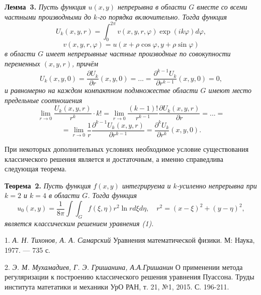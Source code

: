 \textbf{Лемма~3.}
{\it Пусть функция $u(x,y)$ непрерывна в области $G$ вместе со
всеми частными производными до $k$-го порядка включительно.
Тогда функция
$$
U_{k}(x,y,r)=\int_{0}^{2\pi}v(x,y,r,\varphi)\exp(ik\varphi) d\varphi,
$$
$$
 v(x,y,r,\varphi)=u(x+\rho \cos \varphi,y+\rho \sin \varphi)
$$
в области $G$ имеет непрерывные частные производные по
совокупности переменных $(x,y,r)$, причём
$$
U_{k}(x,y,0)=\frac{\partial U_{k}}{\partial r}(x,y,0)=
...=\frac{\partial^{k-1} U_{k}}{\partial r^{k-1}}(x,y,0)=0,
$$
и равномерно на каждом компактном подмножестве
области $G$ имеют место предельные соотношения
$$
\lim_{r\to 0}\frac{U_{k}(x,y,r)}{r^{k}}\cdot k!=
\lim_{r\to 0}\frac{(k-1)!}{r^{k-1}}\frac{\partial U_{k}(x,y,r)}{\partial r}=...=
$$
$$
=\lim_{r\to 0}\frac{1}{r}\frac{\partial^{k-1} U_{k}(x,y,r)}{\partial r^{k-1}}=
\frac{\partial^{k} U_{k}}{\partial r^{k}}(x,y,0).
$$
}

При некоторых дополнительных условиях необходимое условие
существования классического решения является и достаточным,
а именно справедлива следующая теорема.

\textbf{Теорема~2.}
  {\it Пусть функция $f(x,y)$ интегрируема и $k$-усиленно непрерывна
при $k=2$ и $k=4$ в области $G$. Тогда функция
$$
u_{0}(x,y)=\frac{1}{8\pi}\int\int_{G}f(\xi,\eta)r^{2}\ln r d\xi d\eta,\quad
r^{2}=(x-\xi)^{2}+(y-\eta)^{2},
$$
является классическим решением уравнения (1).}


\litlist

1. {\it А. Н. Тихонов, А. А. Самарский } Уравнения математической физики. М: Наука, 1977. — 735 с.

2. {\it Э. М. Мухамадиев, Г. Э. Гришанина, А.А.Гришанин} О применении метода регуляризации к построению классического решения уравнения Пуассона. Труды института матетатики и механики УрО РАН, т. 21, №1, 2015. С. 196-211.
